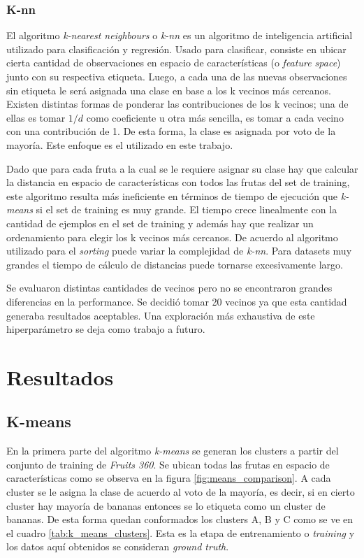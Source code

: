 \documentclass[10pt, a4paper]{article}
\begin{document}
\subsubsection{K-nn}

El algoritmo \textit{k-nearest neighbours} o \textit{k-nn} es un algoritmo de inteligencia artificial utilizado para clasificación y regresión. Usado para clasificar, consiste en ubicar cierta cantidad de observaciones en espacio de características (o \textit{feature space}) junto con su respectiva etiqueta. Luego, a cada una de las nuevas observaciones sin etiqueta le será asignada una clase en base a los k vecinos más cercanos. Existen distintas formas de ponderar las contribuciones de los k vecinos; una de ellas es tomar $1/d$ como coeficiente u otra más sencilla, es tomar a cada vecino con una contribución de 1. De esta forma, la clase es asignada por voto de la mayoría. Este enfoque es el utilizado en este trabajo.

Dado que para cada fruta a la cual se le requiere asignar su clase hay que calcular la distancia en espacio de características con todos las frutas del set de training, este algoritmo resulta más ineficiente en términos de tiempo de ejecución que \textit{k-means} si el set de training es muy grande. El tiempo crece linealmente con la cantidad de ejemplos en el set de training y además hay que realizar un ordenamiento para elegir los k vecinos más cercanos. De acuerdo al algoritmo utilizado para el \textit{sorting} puede variar la complejidad de \textit{k-nn}. Para datasets muy grandes el tiempo de cálculo de distancias puede tornarse excesivamente largo.

Se evaluaron distintas cantidades de vecinos pero no se encontraron grandes diferencias en la performance. Se decidió tomar 20 vecinos ya que esta cantidad generaba resultados aceptables. Una exploración más exhaustiva de este hiperparámetro se deja como trabajo a futuro.

\section{Resultados}

\subsection{K-means}

En la primera parte del algoritmo \textit{k-means} se generan los clusters a partir del conjunto de training de \textit{Fruits 360}. Se ubican todas las frutas en espacio de características como se observa en la figura \ref{fig:means_comparison}. A cada cluster se le asigna la clase de acuerdo al voto de la mayoría, es decir, si en cierto cluster hay mayoría de bananas entonces se lo etiqueta como un cluster de bananas. De esta forma quedan conformados los clusters A, B y C como se ve en el cuadro \ref{tab:k_means_clusters}. Esta es la etapa de entrenamiento o \textit{training} y los datos aquí obtenidos se consideran \textit{ground truth}.
\end{document}
